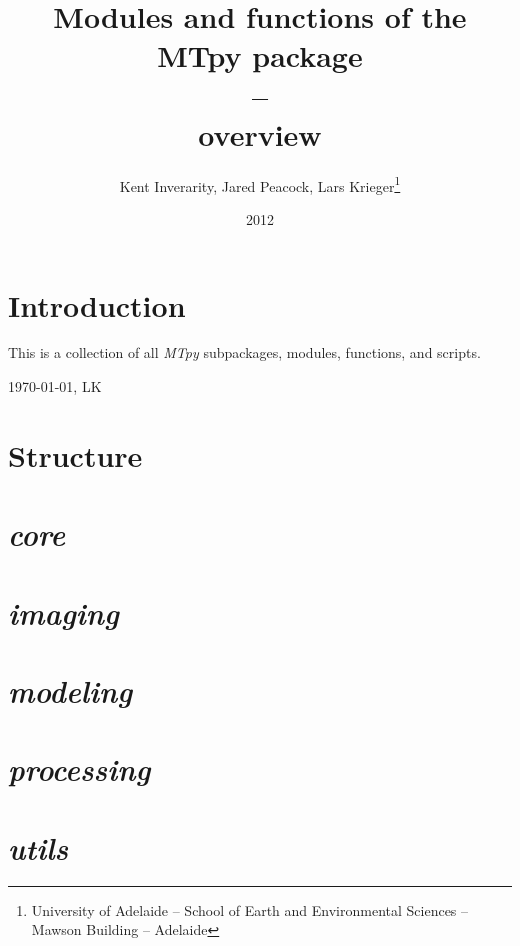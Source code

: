 \documentclass[%
onecolumn,%
10pt,%
DIV14%
]{scrreprt}
\title  {Modules and functions of the MTpy package \\ -- \\ overview}
\author{Kent Inverarity, Jared Peacock, Lars Krieger\thanks{University of Adelaide -- School of Earth and Environmental Sciences -- Mawson Building -- Adelaide}
  }
\date{2012}
\begin{document}
\linenumbers

\maketitle

\chapter*{Introduction}

This is a collection of all \textit{MTpy} subpackages, modules, functions, and scripts. 

\vspace{4cm}
{\small \today, LK} 

\tableofcontents

\chapter{Structure}
\label{ch:Structure}



\chapter{ \textit{core} }
\label{ch:core}


\chapter{ \textit{imaging} }
\label{ch:imaging}


\chapter{ \textit{modeling} }
\label{ch:modeling}


\chapter{ \textit{processing} }
\label{ch:processing}


\chapter{ \textit{utils} }
\label{ch:utils}

\end{document}
